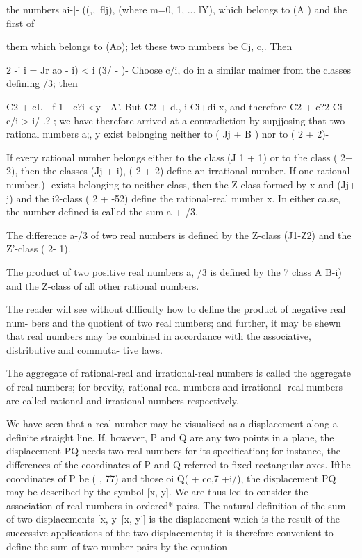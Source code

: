 the numbers ai-|- ((,,\ flj), (where m=0, 1, ... lY), which belongs to
(A ) and the first of

them which belongs to (Ao); let these two numbers be Cj, c,. Then

 2 -' i = Jr ao - i) < i (3/ - )- Choose c/i, do in a similar maimer
from the classes defining /3; then

C2 + cL - f 1 - c?i <y - A'. But C2 + d., i Ci+di x, and therefore C2
+ c?2-Ci-c/i > i/-.?-; we have therefore arrived at a contradiction by
supjjosing that two rational numbers a;, y exist belonging neither to
( Jj + B ) nor to ( 2 + 2)-

If every rational number belongs either to the class (J 1 + 1) or to
the class ( 2+ 2), then the classes (Jj + i), ( 2 + 2) define an
irrational number. If one rational number.)- exists belonging to
neither class, then the Z-class formed by x and (Jj+ j) and the
i2-class ( 2 + -52) define the rational-real number x. In either
ca.se, the number defined is called the sum a + /3.

The difference a-/3 of two real numbers is defined by the Z-class
(J1-Z2) and the Z'-class ( 2- 1).

The product of two positive real numbers a, /3 is defined by the 7
class A B-i) and the Z-class of all other rational numbers.

The reader will see without difficulty how to define the product of
negative real num- bers and the quotient of two real numbers; and
further, it may be shewn that real numbers may be combined in
accordance with the associative, distributive and commuta- tive laws.

The aggregate of rational-real and irrational-real numbers is called
the aggregate of real numbers; for brevity, rational-real numbers and
irrational- real numbers are called rational and irrational numbers
respectively.


We have seen that a real number may be visualised as a displacement
along a definite straight line. If, however, P and Q are any two
points in a plane, the displacement PQ needs two real numbers for its
specification; for instance, the differences of the coordinates of P
and Q referred to fixed rectangular axes. Ifthe coordinates of P be (
, 77) and those oi Q( + cc,7 +i/), the displacement PQ may be
described by the symbol [x, y]. We are thus led to consider the
association of real numbers in ordered* pairs. The natural definition
of the sum of two displacements [x, y\ [x, y'] is the displacement
which is the result of the successive applications of the two
displacements; it is therefore convenient to define the sum of two
number-pairs by the equation

